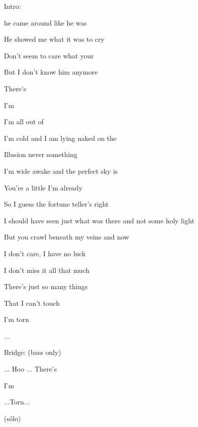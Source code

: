 
Intro: 

    

\zs
{}

 he came around like he was 

He showed me what it was to cry


 Don't seem to care what your 

But I don't know him anymore 

There's 




I'm 
\ks

\zr
I'm all out of  

I'm cold and I am  lying naked on the 

Illusion never  something 

I'm wide awake and  the perfect sky is 

You're a little  I'm already  
\kr

\zs
So I guess the fortune teller's right

I should have seen just what was there and not some holy light

But you crawl beneath my veins and now

I don't care, I have no luck

I don't miss it all that much 

There's just so many things

That I can't touch

I'm torn
\ks

\zr
\kr
...

Bridge: (bass only)

...  Hoo ...  
\zs
There's 




I'm 
\ks

\zr
\kr
...Torn...

\zr
(sólo)
\kr

\kp
